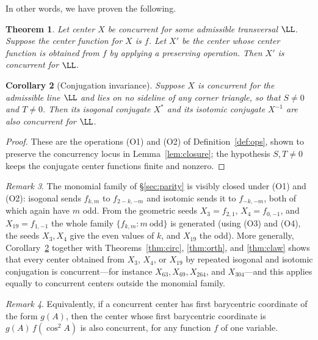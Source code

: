 \documentclass[12pt,a4paper]{amsart}
\newtheorem{theorem}{Theorem} [section]
\newtheorem{corollary}[theorem]{Corollary}
\theoremstyle{remark}
\newtheorem{remark}[theorem]{Remark}
\begin{document}
In other words, we have proven the following.

\begin{theorem}
\label{thm:pres}
Let center $X$ be concurrent for some admissible transversal $\LL$.
Suppose the center function for $X$ is $f$.
Let $X'$  be the center whose center function is obtained from $f$ by applying a preserving operation.
Then $X'$ is concurrent for $\LL$.
\end{theorem}

\begin{corollary}[Conjugation invariance]\label{cor:conj}
Suppose $X$ is concurrent for the admissible line $\LL$ and lies on no sideline
of any corner triangle, so that $S\neq0$ and $T\neq0$. Then its isogonal
conjugate $X^{\ast}$ and its isotomic conjugate $X^{-1}$ are also concurrent
for $\LL$.
\end{corollary}

\begin{proof}
These are the operations (O1) and (O2) of Definition~\ref{def:ops}, shown to preserve the
concurrency locus in Lemma~\ref{lem:closure}; the hypothesis $S,T\neq0$ keeps the
conjugate center functions finite and nonzero.
\end{proof}

\begin{remark}\label{rem:gen}
The monomial family of \S\ref{sec:parity} is visibly closed under (O1) and (O2): isogonal
sends $f_{k,m}$ to $f_{2-k,-m}$ and isotomic sends it to $f_{-k,-m}$, both of
which again have $m$ odd. From the geometric seeds $X_3=f_{2,1}$, $X_4=f_{0,-1}$,
and $X_{19}=f_{1,-1}$ the whole family $\{f_{k,m}:m\ \text{odd}\}$ is generated
(using (O3) and (O4), the seeds $X_3,X_4$ give the even values of $k$, and $X_{19}$ the odd). More
generally, Corollary~\ref{cor:conj} together with
Theorems~\ref{thm:circ}, \ref{thm:orth}, and \ref{thm:claw} shows that every
center obtained from $X_3$, $X_4$, or $X_{19}$ by repeated isogonal and isotomic
conjugation is concurrent---for instance $X_{63},X_{69},X_{264}$, and
$X_{304}$---and this applies equally to concurrent centers outside the monomial
family.
\end{remark}

\begin{remark}
\label{remark:f}
Equivalently, if a concurrent center has first barycentric coordinate of the
form $g(A)$, then the center whose first barycentric coordinate is
$g(A)\,f(\cos^2 A)$ is also concurrent, for any function $f$ of one variable.
\end{remark}
\end{document}
